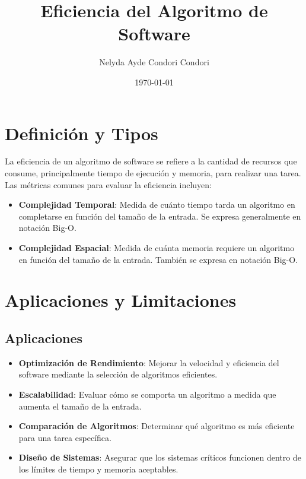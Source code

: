 \documentclass{article}
\title{Eficiencia del Algoritmo de Software}
\author{Nelyda Ayde Condori Condori}
\date{\today}
\begin{document}
\maketitle

\section*{Definición y Tipos}
La eficiencia de un algoritmo de software se refiere a la cantidad de recursos que consume, principalmente tiempo de ejecución y memoria, para realizar una tarea. Las métricas comunes para evaluar la eficiencia incluyen:

\begin{itemize}
    \item \textbf{Complejidad Temporal}: Medida de cuánto tiempo tarda un algoritmo en completarse en función del tamaño de la entrada. Se expresa generalmente en notación Big-O.
    \item \textbf{Complejidad Espacial}: Medida de cuánta memoria requiere un algoritmo en función del tamaño de la entrada. También se expresa en notación Big-O.
\end{itemize}

\section*{Aplicaciones y Limitaciones}

\subsection*{Aplicaciones}
\begin{itemize}
    \item \textbf{Optimización de Rendimiento}: Mejorar la velocidad y eficiencia del software mediante la selección de algoritmos eficientes.
    \item \textbf{Escalabilidad}: Evaluar cómo se comporta un algoritmo a medida que aumenta el tamaño de la entrada.
    \item \textbf{Comparación de Algoritmos}: Determinar qué algoritmo es más eficiente para una tarea específica.
    \item \textbf{Diseño de Sistemas}: Asegurar que los sistemas críticos funcionen dentro de los límites de tiempo y memoria aceptables.
\end{itemize}
\end{document}
